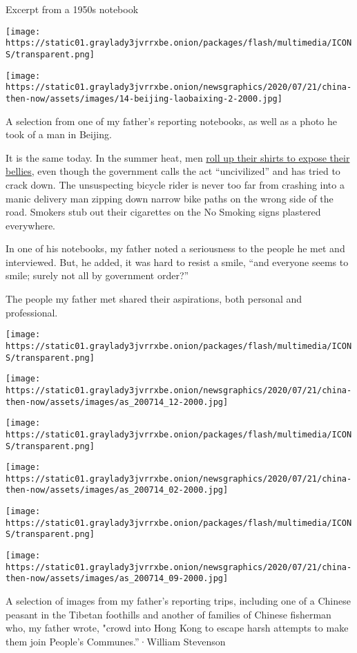 Excerpt from a 1950s notebook

\texttt{[image: https://static01.graylady3jvrrxbe.onion/packages/flash/multimedia/ICONS/transparent.png]}

\texttt{[image: https://static01.graylady3jvrrxbe.onion/newsgraphics/2020/07/21/china-then-now/assets/images/14-beijing-laobaixing-2-2000.jpg]}

A selection from one of my father's reporting notebooks, as well as a
photo he took of a man in Beijing.

It is the same today. In the summer heat, men
\href{https://www.nytimes3xbfgragh.onion/2016/09/02/world/what-in-the-world/china-summer-beijing-bikini.html}{roll
up their shirts to expose their bellies}, even though the government
calls the act ``uncivilized'' and has tried to crack down. The
unsuspecting bicycle rider is never too far from crashing into a manic
delivery man zipping down narrow bike paths on the wrong side of the
road. Smokers stub out their cigarettes on the No Smoking signs
plastered everywhere.

In one of his notebooks, my father noted a seriousness to the people he
met and interviewed. But, he added, it was hard to resist a smile, ``and
everyone seems to smile; surely not all by government order?''

The people my father met shared their aspirations, both personal and
professional.

\texttt{[image: https://static01.graylady3jvrrxbe.onion/packages/flash/multimedia/ICONS/transparent.png]}

\texttt{[image: https://static01.graylady3jvrrxbe.onion/newsgraphics/2020/07/21/china-then-now/assets/images/as\_200714\_12-2000.jpg]}

\texttt{[image: https://static01.graylady3jvrrxbe.onion/packages/flash/multimedia/ICONS/transparent.png]}

\texttt{[image: https://static01.graylady3jvrrxbe.onion/newsgraphics/2020/07/21/china-then-now/assets/images/as\_200714\_02-2000.jpg]}

\texttt{[image: https://static01.graylady3jvrrxbe.onion/packages/flash/multimedia/ICONS/transparent.png]}

\texttt{[image: https://static01.graylady3jvrrxbe.onion/newsgraphics/2020/07/21/china-then-now/assets/images/as\_200714\_09-2000.jpg]}

A selection of images from my father's reporting trips, including one of
a Chinese peasant in the Tibetan foothills and another of families of
Chinese fisherman who, my father wrote, "crowd into Hong Kong to escape
harsh attempts to make them join People's Communes.''·William Stevenson

